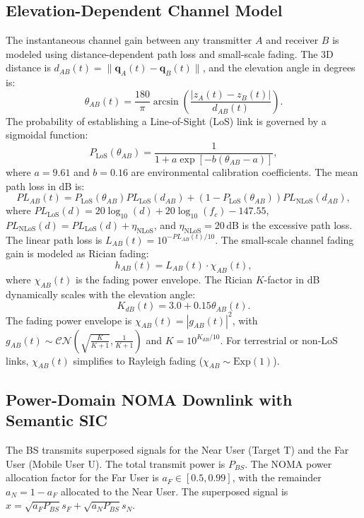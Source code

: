\documentclass[journal,onecolumn]{IEEEtran}
\begin{document}
\subsection{Elevation-Dependent Channel Model}
The instantaneous channel gain between any transmitter $A$ and receiver $B$ is modeled using distance-dependent path loss and small-scale fading. The 3D distance is $d_{AB}(t) = \|\mathbf{q}_A(t) - \mathbf{q}_B(t)\|$, and the elevation angle in degrees is:
\begin{equation}
    \theta_{AB}(t) = \frac{180}{\pi} \arcsin\left( \frac{|z_A(t) - z_B(t)|}{d_{AB}(t)} \right).
\end{equation}
The probability of establishing a Line-of-Sight (LoS) link is governed by a sigmoidal function:
\begin{equation}
    P_{\text{LoS}}(\theta_{AB}) = \frac{1}{1 + a \exp\left[-b\left(\theta_{AB} - a\right)\right]},
\end{equation}
where $a = 9.61$ and $b = 0.16$ are environmental calibration coefficients. The mean path loss in dB is:
\begin{equation}
    PL_{AB}(t) = P_{\text{LoS}}(\theta_{AB}) PL_{\text{LoS}}(d_{AB}) + (1 - P_{\text{LoS}}(\theta_{AB})) PL_{\text{NLoS}}(d_{AB}),
\end{equation}
where $PL_{\text{LoS}}(d) = 20\log_{10}(d) + 20\log_{10}(f_c) - 147.55$, $PL_{\text{NLoS}}(d) = PL_{\text{LoS}}(d) + \eta_{\text{NLoS}}$, and $\eta_{\text{NLoS}} = 20$\,dB is the excessive path loss. The linear path loss is $L_{AB}(t) = 10^{-PL_{AB}(t)/10}$.
The small-scale channel fading gain is modeled as Rician fading:
\begin{equation}
    h_{AB}(t) = L_{AB}(t) \cdot \chi_{AB}(t),
\end{equation}
where $\chi_{AB}(t)$ is the fading power envelope. The Rician $K$-factor in dB dynamically scales with the elevation angle:
\begin{equation}
    K_{dB}(t) = 3.0 + 0.15 \theta_{AB}(t).
\end{equation}
The fading power envelope is $\chi_{AB}(t) = |g_{AB}(t)|^2$, with $g_{AB}(t) \sim \mathcal{CN}(\sqrt{\frac{K}{K+1}}, \frac{1}{K+1})$ and $K = 10^{K_{dB}/10}$. For terrestrial or non-LoS links, $\chi_{AB}(t)$ simplifies to Rayleigh fading ($\chi_{AB} \sim \text{Exp}(1)$).

\subsection{Power-Domain NOMA Downlink with Semantic SIC}
The BS transmits superposed signals for the Near User (Target T) and the Far User (Mobile User U). The total transmit power is $P_{BS}$. The NOMA power allocation factor for the Far User is $a_F \in [0.5, 0.99]$, with the remainder $a_N = 1 - a_F$ allocated to the Near User. The superposed signal is $x = \sqrt{a_F P_{BS}} s_F + \sqrt{a_N P_{BS}} s_N$.
\end{document}
